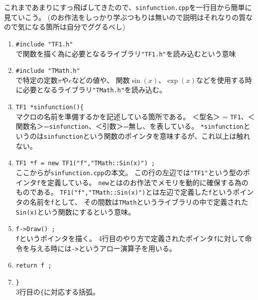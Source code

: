 これまであまりにすっ飛ばしてきたので、\verb|sinfunction.cpp|を一行目から簡単に見ていこう。
(\Cpp のお作法をしっかり学ぶつもりは無いので説明はそれなりの質なので気になる箇所は自分でググるべし)
\begin{enumerate}
 \item \verb|#include "TF1.h"| \\
       \ROOT で関数を描く為に必要となるライブラリ\verb|"TF1.h"|を読み込むという意味
 \item \verb|#include "TMath.h"| \\ 
       \ROOT で特定の定数$\pi$や$e$などの値や、
       関数$\sin(x)$、$\exp(x)$などを使用する時に必要となるライブラリ\verb|"TMath.h"|を読み込む。
 \item \verb|TF1 *sinfunction(){ |\\
       マクロの名前を準備するかを記述している箇所である。
       ＜型名＞ = \verb|TF1|、＜関数名＞=\verb|sinfunction|、＜引数＞=無し、を表している。
       \verb|*sinfunction|というのは\verb|sinfunction|という関数のポインタを意味するが、これ以上は触れない。
 \item \verb|TF1 *f = new TF1("f","TMath::Sin(x)") ;| \\
       ここからが\verb|sinfunction.cpp|の本文。
       この行の左辺では\verb|"TF1"|という型のポインタ\verb|f|を定義している。
       \verb|new|とは\Cpp のお作法でメモリを動的に確保する為のものである。
       \verb|TF1("f","TMath::Sin(x)")|とは左辺で定義した\verb|f|というポインタの名前を\verb|f|として、
       その間数は\verb|TMath|というライブラリの中で定義された\verb|Sin(x)|という関数にするという意味。
 \item \verb|f->Draw() ;| \\
       \verb|f|というポインタを描く。
       4行目のやり方で定義されたポインタ\verb|f|に対して命令を与える時には\verb|->|というアロー演算子を用いる。
 \item \verb|return f ;|
 \item \verb|}| \\
       3行目の\verb|{|に対応する括弧。
\end{enumerate}


